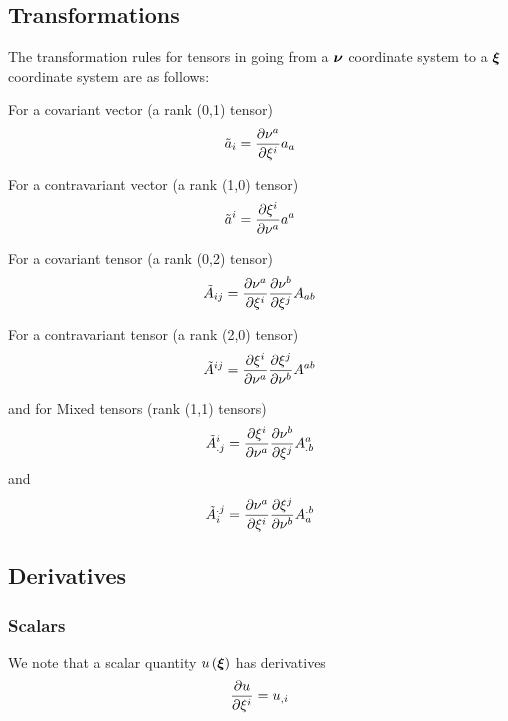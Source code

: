 \subsection{Transformations}

The transformation rules for tensors in going from a $\boldsymbol{\nu}$ coordinate
system to a $\boldsymbol{\xi}$ coordinate system are as follows: 


For a covariant vector (a rank (0,1) tensor)
\begin{equation}
  {\tilde{a}}_{i}= \dfrac{\partial \nu^{a}}{\partial \xi^{i}} a_{a}
\end{equation}

For a contravariant vector (a rank (1,0) tensor)
\begin{equation}
  {\tilde{a}}^{i}= \dfrac{\partial \xi^{i}}{\partial \nu^{a}} a^{a}
\end{equation}

For a covariant tensor (a rank (0,2) tensor)
\begin{equation}
  {\tilde{A}}_{ij}= \dfrac{\partial \nu^{a}}{\partial \xi^{i}}  \dfrac{\partial \nu^{b}}{\partial \xi^{j}} A_{ab} 
\end{equation}

For a contravariant tensor (a rank (2,0) tensor)
\begin{equation}
  {\tilde{A}}^{ij}= \dfrac{\partial \xi^{i}}{\partial \nu^{a}}  \dfrac{\partial \xi^{j}}{\partial \nu^{b}} A^{ab}
\end{equation}

and for Mixed tensors (rank (1,1) tensors)
\begin{equation}
  {\tilde{A}}^{i}_{.j}= \dfrac{\partial \xi^{i}}{\partial \nu^{a}}  \dfrac{\partial \nu^{b}}{\partial \xi^{j}} A^{a}_{.b}
\end{equation}
and
\begin{equation}
  {\tilde{A}}_{i}^{.j}= \dfrac{\partial \nu^{a}}{\partial \xi^{i}}  \dfrac{\partial \xi^{j}}{\partial \nu^{b}} A_{a}^{.b}
\end{equation}

\subsection{Derivatives}
\label{subsec:function derivatives}

\subsubsection{Scalars}

We note that a scalar quantity $ u\left( \boldsymbol{\xi} \right) $ has derivatives
\begin{equation}
   \dfrac{\partial u}{\partial \xi^{i}} = {u}_{,i} 
\end{equation}

